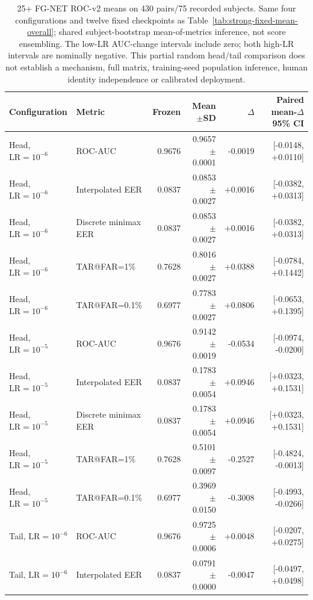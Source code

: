 \documentclass[journal]{IEEEtran}
\begin{document}
\begin{table}[!t]
\caption{25+ FG-NET ROC-v2 means on 430 pairs/75 recorded subjects. Same four configurations and twelve fixed checkpoints as Table~\ref{tab:strong-fixed-mean-overall}; shared subject-bootstrap mean-of-metrics inference, not score ensembling. The low-LR AUC-change intervals include zero; both high-LR intervals are nominally negative. This partial random head/tail comparison does not establish a mechanism, full matrix, training-seed population inference, human identity independence or calibrated deployment.}
\label{tab:strong-fixed-mean-25plus}
\centering\scriptsize
\begin{tabular}{llrrrr}
\toprule
Configuration & Metric & Frozen & Mean$\pm$SD & $\Delta$ & Paired mean-$\Delta$ 95\% CI \\
\midrule
Head, $\mathrm{LR}=10^{-6}$ & ROC-AUC & 0.9676 & 0.9657$\pm$0.0001 & -0.0019 & [-0.0148, +0.0110] \\
Head, $\mathrm{LR}=10^{-6}$ & Interpolated EER & 0.0837 & 0.0853$\pm$0.0027 & +0.0016 & [-0.0382, +0.0313] \\
Head, $\mathrm{LR}=10^{-6}$ & Discrete minimax EER & 0.0837 & 0.0853$\pm$0.0027 & +0.0016 & [-0.0382, +0.0313] \\
Head, $\mathrm{LR}=10^{-6}$ & TAR@FAR=1\% & 0.7628 & 0.8016$\pm$0.0027 & +0.0388 & [-0.0784, +0.1442] \\
Head, $\mathrm{LR}=10^{-6}$ & TAR@FAR=0.1\% & 0.6977 & 0.7783$\pm$0.0027 & +0.0806 & [-0.0653, +0.1395] \\
Head, $\mathrm{LR}=10^{-5}$ & ROC-AUC & 0.9676 & 0.9142$\pm$0.0019 & -0.0534 & [-0.0974, -0.0200] \\
Head, $\mathrm{LR}=10^{-5}$ & Interpolated EER & 0.0837 & 0.1783$\pm$0.0054 & +0.0946 & [+0.0323, +0.1531] \\
Head, $\mathrm{LR}=10^{-5}$ & Discrete minimax EER & 0.0837 & 0.1783$\pm$0.0054 & +0.0946 & [+0.0323, +0.1531] \\
Head, $\mathrm{LR}=10^{-5}$ & TAR@FAR=1\% & 0.7628 & 0.5101$\pm$0.0097 & -0.2527 & [-0.4824, -0.0013] \\
Head, $\mathrm{LR}=10^{-5}$ & TAR@FAR=0.1\% & 0.6977 & 0.3969$\pm$0.0150 & -0.3008 & [-0.4993, -0.0266] \\
Tail, $\mathrm{LR}=10^{-6}$ & ROC-AUC & 0.9676 & 0.9725$\pm$0.0006 & +0.0048 & [-0.0207, +0.0275] \\
Tail, $\mathrm{LR}=10^{-6}$ & Interpolated EER & 0.0837 & 0.0791$\pm$0.0000 & -0.0047 & [-0.0497, +0.0498] \\

\end{tabular}
\end{table}
\end{document}
